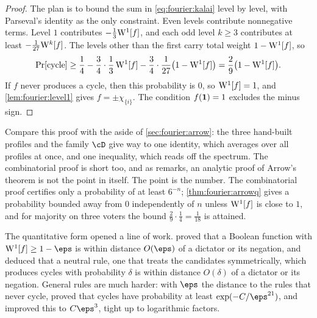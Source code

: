 \begin{refsection}
\begin{proof}
The plan is to bound the sum in \eqref{eq:fourier:kalai} level by level, with Parseval's identity as the only constraint. Even levels contribute nonnegative terms. Level $1$ contributes $-\frac13\mathrm{W}^{1}[f]$, and each odd level $k\ge3$ contributes at least $-\frac1{27}\mathrm{W}^{k}[f]$. The levels other than the first carry total weight $1-\mathrm{W}^{1}[f]$, so
\[
  \Pr[\text{cycle}]\ge\frac14-\frac34\cdot\frac13\,\mathrm{W}^{1}[f]-\frac34\cdot\frac1{27}\bigl(1-\mathrm{W}^{1}[f]\bigr)=\frac29\bigl(1-\mathrm{W}^{1}[f]\bigr).
\]
If $f$ never produces a cycle, then this probability is $0$, so $\mathrm{W}^{1}[f]=1$, and \cref{lem:fourier:level1} gives $f=\pm\chi_{\{i\}}$. The condition $f(\mathbf{1})=1$ excludes the minus sign.
\end{proof}

Compare this proof with the aside of \cref{sec:fourier:arrow}: the three hand-built profiles and the family $\cD$ give way to one identity, which averages over all profiles at once, and one inequality, which reads off the spectrum. The combinatorial proof is short too, and as \textcite{Keller2012} remarks, an analytic proof of Arrow's theorem is not the point in itself. The point is the number. The combinatorial proof certifies only a probability of at least $6^{-n}$; \cref{thm:fourier:arrowq} gives a probability bounded away from $0$ independently of $n$ unless $\mathrm{W}^{1}[f]$ is close to $1$, and for majority on three voters the bound $\frac29\cdot\frac14=\frac1{18}$ is attained.


The quantitative form opened a line of work. \Textcite{FriedgutKalaiNaor2002} proved that a Boolean function with $\fourierW1[f]\ge1-\eps$ is within distance $O(\eps)$ of a dictator or its negation, and \textcite{Kalai2002} deduced that a neutral rule, one that treats the candidates symmetrically, which produces cycles with probability $\delta$ is within distance $O(\delta)$ of a dictator or its negation. General rules are much harder: with $\eps$ the distance to the rules that never cycle, \textcite{Mossel2012} proved that cycles have probability at least $\exp(-C/\eps^{21})$, and \textcite{Keller2012} improved this to $C\eps^3$, tight up to logarithmic factors.


\end{refsection}

